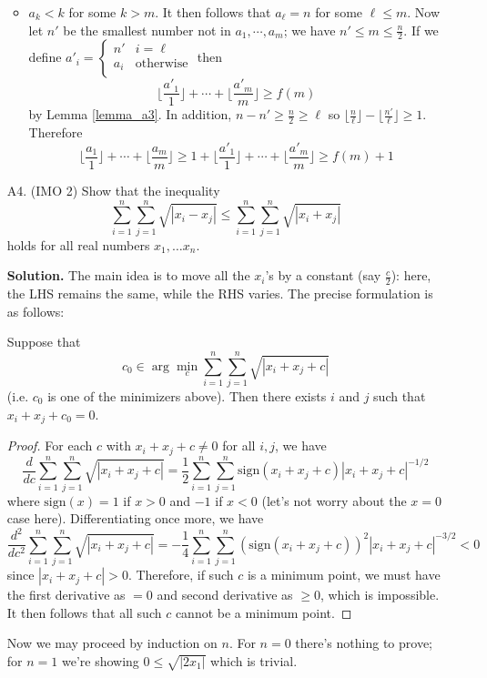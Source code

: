 \documentclass[11pt,a4paper]{article}
\begin{document}
\begin{enumerate}
\begin{itemize}
			\item $a_k < k$ for some $k > m$. 
			It then follows that $a_{\ell}=n$ for some $\ell\le m$. 
			Now let $n'$ be the smallest number not in $a_1, \cdots, a_m$; we have $n'\le m\le \frac n2$. 
			If we define $a'_i = \begin{cases}
				n' & i=\ell\\
				a_i & \text{otherwise}\\
			\end{cases}$
		    then 
		    \[
		    \lfloor \frac {a'_1}{1}\rfloor + \cdots + \lfloor \frac {a'_m}{m}\rfloor\ge f(m)
		    \]
		    by Lemma \ref{lemma_a3}. In addition, $n - n'\ge \frac{n}{2}\ge \ell$ so 
		    $\lfloor \frac{n}{\ell}\rfloor - \lfloor \frac{n'}{\ell}\rfloor \ge 1$. 
		    Therefore 
		    \[
		    \lfloor \frac {a_1}{1}\rfloor + \cdots + \lfloor \frac {a_m}{m}\rfloor
		    \ge 
		    1 + \lfloor \frac {a'_1}{1}\rfloor + \cdots + \lfloor \frac {a'_m}{m}\rfloor
		    \ge f(m) + 1
		    \]
		    
		\end{itemize}
	
	    \item[A4.] (IMO 2)
	    Show that the inequality\[\sum_{i=1}^n \sum_{j=1}^n \sqrt{|x_i-x_j|}\leqslant \sum_{i=1}^n \sum_{j=1}^n \sqrt{|x_i+x_j|}\]holds for all real numbers $x_1,\ldots x_n.$
	    
	    \textbf{Solution.} 
	    The main idea is to move all the $x_i$'s by a constant (say $\frac{c}{2}$): here, the LHS remains the same, while the RHS varies. 
	    The precise formulation is as follows: 
	    \begin{lemma}
	    	Suppose that 
	    	\[
	    	c_0\in \arg\min_{c}\sum_{i=1}^n \sum_{j=1}^n \sqrt{|x_i+x_j + c|}
	    	\]
	    	(i.e. $c_0$ is one of the minimizers above). 
	    	Then there exists $i$ and $j$ such that $x_i+x_j+c_0=0$. 
	    \end{lemma}
        
        \begin{proof}
        	For each $c$ with $x_i+x_j+c\neq 0$ for all $i, j$, we have 
        	\[
        	\frac{d}{dc} \sum_{i=1}^n \sum_{j=1}^n \sqrt{|x_i+x_j + c|}
        	=\frac 12\sum_{i=1}^n \sum_{j=1}^n\text{sign}(x_i+x_j+c)|x_i+x_j + c|^{-1/2}
        	\]
        	where $\text{sign}(x)=1$ if $x>0$ and $-1$ if $x<0$ (let's not worry about the $x=0$ case here). 
        	Differentiating once more, we have 
        	\[
        	\frac{d^2}{dc^2} \sum_{i=1}^n \sum_{j=1}^n \sqrt{|x_i+x_j + c|}
        	=-\frac 14\sum_{i=1}^n \sum_{j=1}^n(\text{sign}(x_i+x_j+c))^2|x_i+x_j + c|^{-3/2}
        	< 0
        	\]
        	since $|x_i+x_j + c| > 0$. 
        	Therefore, if such $c$ is a minimum point, we must have the first derivative as $=0$ and second derivative as $\ge 0$, which is impossible. 
        	It then follows that all such $c$ cannot be a minimum point. 
        \end{proof}
        Now we may proceed by induction on $n$. 
        For $n=0$ there's nothing to prove; for $n=1$ we're showing $0\le \sqrt{|2x_1|}$ which is trivial. 
        

\end{enumerate}
\end{document}
